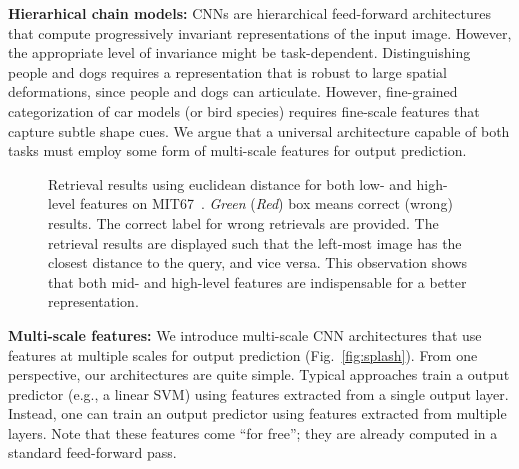 \documentclass[10pt,twocolumn,letterpaper]{article}
\begin{document}
{\bf Hierarhical chain models:}  CNNs are 
hierarchical feed-forward architectures that compute progressively invariant representations of the input image. However, the appropriate level of invariance might be task-dependent. Distinguishing people and dogs requires a representation that is robust to large spatial deformations, since people and dogs can articulate. However, fine-grained categorization of car models (or bird species) requires fine-scale features that capture subtle shape cues. We argue that a universal architecture capable of both tasks must employ some form of multi-scale features for output prediction.

\begin{figure}
\centering

\caption{Retrieval results using euclidean distance for both low- and high-level features on MIT67~\cite{MIT67}. \textit{Green} (\textit{Red}) box means correct (wrong) results. The correct label for wrong retrievals are provided. The retrieval results are displayed such that the left-most image has the closest distance to the query, and vice versa. This observation shows that both mid- and high-level features are indispensable for a better representation.}

\label{fig:moti}
\end{figure}


{\bf Multi-scale features:} We introduce multi-scale CNN architectures that use features at multiple scales for output prediction (Fig.~\ref{fig:splash}). From one perspective, our architectures are quite simple. Typical approaches train a output predictor (e.g., a linear SVM) using features extracted from a single output layer. Instead, one can train an output predictor using features extracted from multiple layers. Note that these features come ``for free''; they are already computed in a standard feed-forward pass. 
\end{document}
